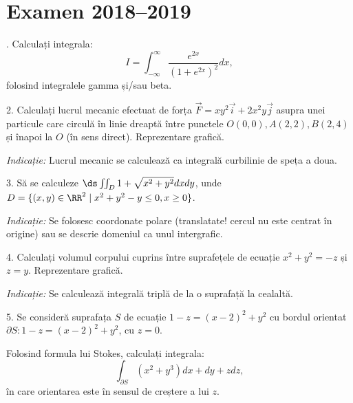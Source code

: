 
\chapter{Examen 2018--2019}

\indent{}. Calculați integrala:
\[
  I = \int_{-\infty}^\infty \frac{e^{2x}}{(1 + e^{2x})^2} dx,
\]
folosind integralele gamma și/sau beta.

\vspace{0.5cm}

2. Calculați lucrul mecanic efectuat de forța $ \vec{F} = xy^2 \vec{i} + 2x^2y \vec{j} $
asupra unei particule care circulă în linie dreaptă între punctele $ O(0, 0), A(2, 2), B(2, 4) $
și înapoi la $ O $ (în sens direct). Reprezentare grafică.

\emph{Indicație:} Lucrul mecanic se calculează ca integrală curbilinie
de speța a doua.

\vspace{0.5cm}

3. Să se calculeze $ \ds\iint_D 1 + \sqrt{x^2 + y^2} dxdy $, unde
$ D = \{ (x, y) \in \RR^2 \mid x^2 + y^2 - y \leq 0, x \geq 0 \} $.

\emph{Indicație:} Se folosesc coordonate polare (translatate! cercul nu este
centrat în origine) sau se descrie domeniul ca unul intergrafic.

\vspace{0.5cm}

4. Calculați volumul corpului cuprins între suprafețele de ecuație $ x^2 + y^2 = -z $
și $ z = y $. Reprezentare grafică.

\emph{Indicație:} Se calculează integrală triplă de la o suprafață la cealaltă.

\vspace{0.5cm}

5. Se consideră suprafața $ S $ de ecuație $ 1 - z = (x - 2)^2 + y^2 $ cu
bordul orientat $ \partial S : 1 - z = (x - 2)^2 + y^2$, cu $ z = 0 $.

Folosind formula lui Stokes, calculați integrala:
\[
  \int_{\partial S} (x^2 + y^3) dx + dy + zdz,
\]
în care orientarea este în sensul de creștere a lui $ z $.


